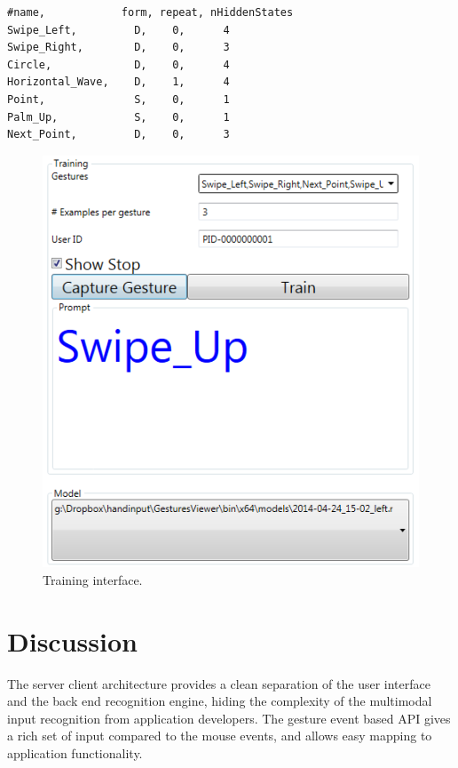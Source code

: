 \begin{lstlisting}[caption={Gesture definition file.},
label={lst:gesture-def}] 
#name,            form, repeat, nHiddenStates
Swipe_Left,         D,    0,      4
Swipe_Right,        D,    0,      3
Circle,             D,    0,      4
Horizontal_Wave,    D,    1,      4
Point,              S,    0,      1
Palm_Up,            S,    0,      1
Next_Point,         D,    0,      3
\end{lstlisting}

\begin{figure}[tbh]
\centering
\includegraphics[width=0.5\columnwidth]{figures/training_interface.PNG}
\caption{Training interface.}
\label{fig:training}
\end{figure}

\section{Discussion}
The server client architecture provides a clean separation of the user
interface and the back end recognition engine, hiding the complexity of the
multimodal input recognition from application developers. The gesture event
based API gives a rich set of input compared to the mouse events, and allows
easy mapping to application functionality.


